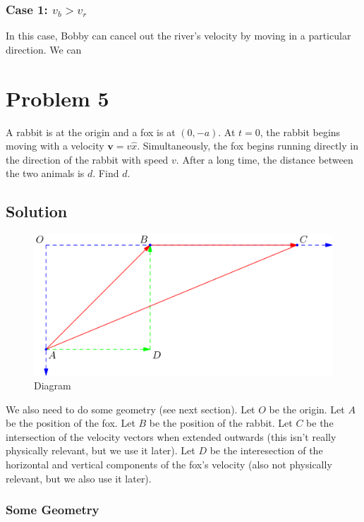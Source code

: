 \documentclass[11pt]{scrartcl}
\begin{document}
\subsubsection{Case 1: $v_b > v_r $}
In this case, Bobby can cancel out the river's velocity by moving in a particular direction.
We can 

\newpage

\section{Problem 5}
A rabbit is at the origin and a fox is at $(0, -a)$.
At $t=0$, the rabbit begins moving with a velocity $\bm{v} = v \hat{x}$.
Simultaneously, the fox begins running directly in the direction of the rabbit with speed $v$.
After a long time, the distance between the two animals is $d$.
Find $d$.

\subsection{Solution}
\begin{figure}[h]
\caption{Diagram}
\centering
\includegraphics[scale = 0.5]{diagram5.png}
\end{figure}

We also need to do some geometry (see next section).
Let $O$ be the origin.
Let $A$ be the position of the fox.
Let $B$ be the position of the rabbit.
Let $C$ be the intersection of the velocity vectors when extended outwards (this isn't really physically relevant, but we use it later).
Let $D$ be the interesection of the horizontal and vertical components of the fox's velocity (also not physically relevant, but we also use it later).

\subsubsection{Some Geometry}
\end{document}
